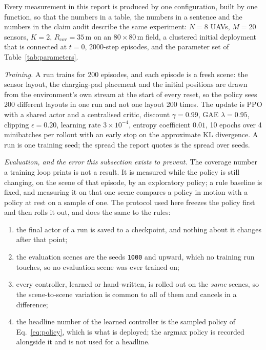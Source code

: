 \documentclass[conference]{IEEEtran}
\begin{document}
Every measurement in this report is produced by one configuration, built by one
function, so that the numbers in a table, the numbers in a sentence and the
numbers in the claim audit describe the same experiment: $N=8$ UAVs, $M=20$
sensors, $K=2$, $R_{\mathrm{cov}}=35$\,m on an $80\times80$\,m field, a
clustered initial deployment that is connected at $t=0$, 2000-step episodes,
and the parameter set of Table~\ref{tab:parameters}.

\emph{Training.}  A run trains for 200 episodes, and each episode is a fresh
scene: the sensor layout, the charging-pad placement and the initial positions
are drawn from the environment's own stream at the start of every reset, so the
policy sees 200 different layouts in one run and not one layout 200 times.  The
update is PPO with a shared actor and a centralised critic, discount
$\gamma=0.99$, GAE $\lambda=0.95$, clipping $\epsilon=0.20$, learning rate
$3\times10^{-4}$, entropy coefficient $0.01$, 10 epochs over 4 minibatches per
rollout with an early stop on the approximate KL divergence.  A run is one
training seed; the spread the report quotes is the spread over seeds.

\emph{Evaluation, and the error this subsection exists to prevent.}  The
coverage number a training loop prints is not a result.  It is measured while
the policy is still changing, on the scene of that episode, by an exploratory
policy; a rule baseline is fixed, and measuring it on that one scene compares a
policy in motion with a policy at rest on a sample of one.  The protocol used
here freezes the policy first and then rolls it out, and does the same to the
rules:

\begin{enumerate}
  \item the final actor of a run is saved to a checkpoint, and nothing about it
        changes after that point;
  \item the evaluation scenes are the seeds \texttt{1000} and upward, which no
        training run touches, so no evaluation scene was ever trained on;
  \item every controller, learned or hand-written, is rolled out on the
        \emph{same} scenes, so the scene-to-scene variation is common to all of
        them and cancels in a difference;
  \item the headline number of the learned controller is the sampled policy of
        Eq.~\eqref{eq:policy}, which is what is deployed; the argmax policy is
        recorded alongside it and is not used for a headline.
\end{enumerate}
\end{document}
